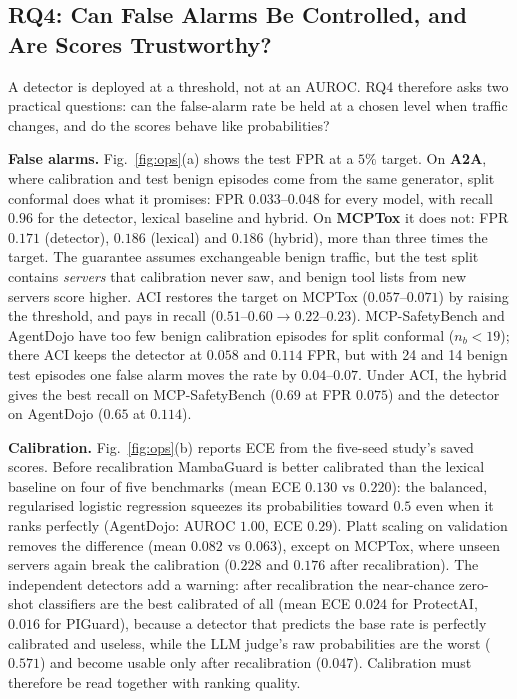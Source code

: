 \documentclass[conference,compsoc]{IEEEtran}
\begin{document}
\subsection{RQ4: Can False Alarms Be Controlled, and Are Scores Trustworthy?}
\label{sec:res-conformal}
A detector is deployed at a threshold, not at an AUROC. RQ4 therefore asks two practical questions: can the false-alarm rate be held at a chosen level when traffic changes, and do the scores behave like probabilities?

\textbf{False alarms.} Fig.~\ref{fig:ops}(a) shows the test FPR at a $5\%$ target. On \textbf{A2A}, where calibration and test benign episodes come from the same generator, split conformal does what it promises: FPR $0.033$--$0.048$ for every model, with recall $0.96$ for the detector, lexical baseline and hybrid. On \textbf{MCPTox} it does not: FPR $0.171$ (detector), $0.186$ (lexical) and $0.186$ (hybrid), more than three times the target. The guarantee assumes exchangeable benign traffic, but the test split contains \emph{servers} that calibration never saw, and benign tool lists from new servers score higher. ACI restores the target on MCPTox ($0.057$--$0.071$) by raising the threshold, and pays in recall ($0.51$--$0.60\to0.22$--$0.23$). MCP-SafetyBench and AgentDojo have too few benign calibration episodes for split conformal ($n_{b}<19$); there ACI keeps the detector at $0.058$ and $0.114$ FPR, but with 24 and 14 benign test episodes one false alarm moves the rate by $0.04$--$0.07$. Under ACI, the hybrid gives the best recall on MCP-SafetyBench ($0.69$ at FPR $0.075$) and the detector on AgentDojo ($0.65$ at $0.114$).

\textbf{Calibration.} Fig.~\ref{fig:ops}(b) reports ECE from the five-seed study's saved scores. Before recalibration MambaGuard is better calibrated than the lexical baseline on four of five benchmarks (mean ECE $0.130$ vs $0.220$): the balanced, regularised logistic regression squeezes its probabilities toward $0.5$ even when it ranks perfectly (AgentDojo: AUROC $1.00$, ECE $0.29$). Platt scaling on validation removes the difference (mean $0.082$ vs $0.063$), except on MCPTox, where unseen servers again break the calibration ($0.228$ and $0.176$ after recalibration). The independent detectors add a warning: after recalibration the near-chance zero-shot classifiers are the best calibrated of all (mean ECE $0.024$ for ProtectAI, $0.016$ for PIGuard), because a detector that predicts the base rate is perfectly calibrated and useless, while the LLM judge's raw probabilities are the worst ($0.571$) and become usable only after recalibration ($0.047$). Calibration must therefore be read together with ranking quality.
\end{document}
